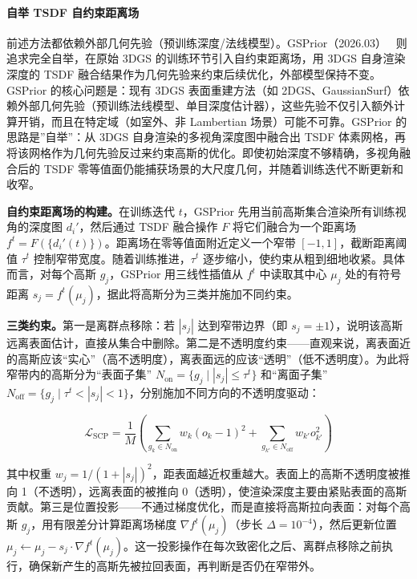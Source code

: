 \paragraph{自举 TSDF 自约束距离场}

前述方法都依赖外部几何先验（预训练深度/法线模型）。GSPrior（2026.03）~\cite{2603_19682} 则追求完全自举，在原始 3DGS 的训练环节引入自约束距离场，用 3DGS 自身渲染深度的 TSDF 融合结果作为几何先验来约束后续优化，外部模型保持不变。GSPrior 的核心问题是：现有 3DGS 表面重建方法（如 2DGS、GaussianSurf）依赖外部几何先验（预训练法线模型、单目深度估计器），这些先验不仅引入额外计算开销，而且在特定域（如室外、非 Lambertian 场景）可能不可靠。GSPrior 的思路是”自举”：从 3DGS 自身渲染的多视角深度图中融合出 TSDF 体素网格，再将该网格作为几何先验反过来约束高斯的优化。即使初始深度不够精确，多视角融合后的 TSDF 零等值面仍能捕获场景的大尺度几何，并随着训练迭代不断更新和收窄。

\textbf{自约束距离场的构建。}在训练迭代 $t$，GSPrior 先用当前高斯集合渲染所有训练视角的深度图 $d_i'$，然后通过 TSDF 融合操作 $F$ 将它们融合为一个距离场 $f^t = F(\{d_i'(t)\})$。距离场在零等值面附近定义一个窄带 $[-1, 1]$，截断距离阈值 $\tau^t$ 控制窄带宽度。随着训练推进，$\tau^t$ 逐步缩小，使约束从粗到细地收紧。具体而言，对每个高斯 $g_j$，GSPrior 用三线性插值从 $f^t$ 中读取其中心 $\mu_j$ 处的有符号距离 $s_j = f^t(\mu_j)$，据此将高斯分为三类并施加不同约束。

\textbf{三类约束。}第一是离群点移除：若 $|s_j|$ 达到窄带边界（即 $s_j = \pm 1$），说明该高斯远离表面估计，直接从集合中删除。第二是不透明度约束——直观来说，离表面近的高斯应该“实心”（高不透明度），离表面远的应该“透明”（低不透明度）。为此将窄带内的高斯分为“表面子集” $N_{\text{on}} = \{g_j \mid |s_j| \leq \tau^t\}$ 和“离面子集” $N_{\text{off}} = \{g_j \mid \tau^t < |s_j| < 1\}$，分别施加不同方向的不透明度驱动：

\begin{equation}
    \mathcal{L}_{\text{SCP}} = \frac{1}{M}\left(\sum_{g_k \in N_{\text{on}}} w_k (o_k - 1)^2 + \sum_{g_{k'} \in N_{\text{off}}} w_{k'} o_{k'}^2\right)
\end{equation}

其中权重 $w_j = 1 / (1 + |s_j|)^2$，距表面越近权重越大。表面上的高斯不透明度被推向 1（不透明），远离表面的被推向 0（透明），使渲染深度主要由紧贴表面的高斯贡献。第三是位置投影——不通过梯度优化，而是直接将高斯拉向表面：对每个高斯 $g_j$，用有限差分计算距离场梯度 $\nabla f^t(\mu_j)$（步长 $\Delta = 10^{-4}$），然后更新位置 $\mu_j \leftarrow \mu_j - s_j \cdot \nabla f^t(\mu_j)$。这一投影操作在每次致密化之后、离群点移除之前执行，确保新产生的高斯先被拉回表面，再判断是否仍在窄带外。

